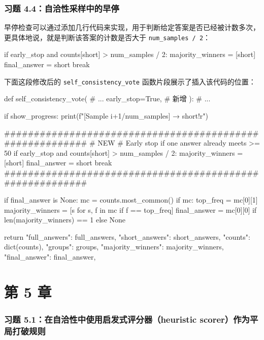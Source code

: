 \subsubsection*{习题 4.4：自洽性采样中的早停}

早停检查可以通过添加几行代码来实现，用于判断给定答案是否已经被计数多次，更具体地说，就是判断该答案的计数是否大于 \texttt{num\_samples / 2}：

\begin{codebox}
if early_stop and counts[short] > num_samples / 2:
    majority_winners = [short]
    final_answer = short
    break
\end{codebox}

下面这段修改后的 \texttt{self\_consistency\_vote} 函数片段展示了插入该代码的位置：

\begin{codebox}
def self_consistency_vote(
    # ...
    early_stop=True,   # 新增
):
    # ...

        if show_progress:
            print(f"[Sample {i+1}/{num_samples}] → {short!r}")

        #########################################################
        # NEW
        # Early stop if one answer already meets >= 50%
        if early_stop and counts[short] > num_samples / 2:
            majority_winners = [short]
            final_answer = short
            break
        #########################################################

    if final_answer is None:
        mc = counts.most_common()
        if mc:
            top_freq = mc[0][1]
            majority_winners = [s for s, f in mc if f == top_freq]
            final_answer = mc[0][0] if len(majority_winners) == 1 else None

    return {
        "full_answers": full_answers,
        "short_answers": short_answers,
        "counts": dict(counts),
        "groups": groups,
        "majority_winners": majority_winners,
        "final_answer": final_answer,
    }
\end{codebox}

\section{第 5 章}

\subsubsection*{习题 5.1：在自洽性中使用启发式评分器（heuristic scorer）作为平局打破规则}

